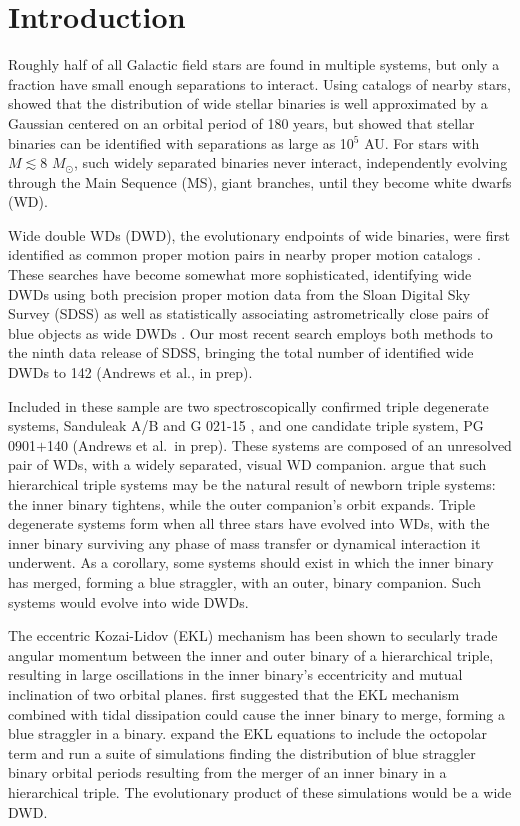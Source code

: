 \documentclass{emulateapj}
\newcommand{\Msun}{\ifmmode {M_{\odot}}\else${M_{\odot}}$\fi}
\begin{document}
\section{Introduction} \label{sec:intro}


Roughly half of all Galactic field stars are found in multiple systems, but only a fraction have small enough separations to interact. Using catalogs of nearby stars, \citet{duquennoy91} showed that the distribution of wide stellar binaries is well approximated by a Gaussian centered on an orbital period of 180 years, but \citet{dhital10} showed that stellar binaries can be identified with separations as large as 10$^5$ AU. For stars with $M\lesssim8$ \Msun, such widely separated binaries never interact, independently evolving through the Main Sequence (MS), giant branches, until they become white dwarfs (WD).


Wide double WDs (DWD), the evolutionary endpoints of wide binaries, were first identified as common proper motion pairs in nearby proper motion catalogs \citep{sanduleak82,greenstein86,sion91}. These searches have become somewhat more sophisticated, identifying wide DWDs using both precision proper motion data from the Sloan Digital Sky Survey (SDSS) \citep{andrews12} as well as statistically associating astrometrically close pairs of blue objects as wide DWDs \citep{baxter14}. Our most recent search employs both methods to the ninth data release of SDSS, bringing the total number of identified wide DWDs to 142 (Andrews et al., in prep).


Included in these sample are two spectroscopically confirmed triple degenerate systems, Sanduleak A/B \citep{maxted00} and G 021-15 \citep{farihi05}, and one candidate triple system, PG 0901$+$140 (Andrews et al.\ in prep). These systems are composed of an unresolved pair of WDs, with a widely separated, visual WD companion. \citet{reipurth12} argue that such hierarchical triple systems may be the natural result of newborn triple systems: the inner binary tightens, while the outer companion's orbit expands. Triple degenerate systems form when all three stars have evolved into WDs, with the inner binary surviving any phase of mass transfer or dynamical interaction it underwent. As a corollary, some systems should exist in which the inner binary has merged, forming a blue straggler, with an outer, binary companion. Such systems would evolve into wide DWDs.


The eccentric Kozai-Lidov (EKL) mechanism has been shown to secularly trade angular momentum between the inner and outer binary of a hierarchical triple, resulting in large oscillations in the inner binary's eccentricity and mutual inclination of two orbital planes. \citet{perets09} first suggested that the EKL mechanism combined with tidal dissipation could cause the inner binary to merge, forming a blue straggler in a binary. \citet{naoz14} expand the EKL equations to include the octopolar term and run a suite of simulations finding the distribution of blue straggler binary orbital periods resulting from the merger of an inner binary in a hierarchical triple. The evolutionary product of these simulations would be a wide DWD.
\end{document}

